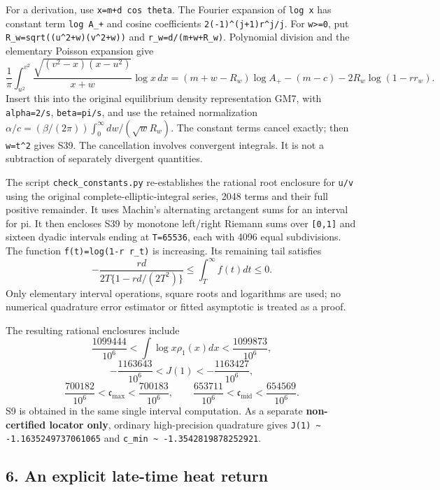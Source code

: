 \documentclass[11pt]{article}
\begin{document}
For a derivation, use \texttt{x=m+d\ cos\ theta}. The Fourier expansion of \texttt{log\ x} has constant term \texttt{log\ A\_+} and cosine coefficients \nolinkurl{2(-1)^(j+1)r^j/j}. For \texttt{w\textgreater{}=0}, put \nolinkurl{R_w=sqrt((u^2+w)(v^2+w))} and \texttt{r\_w=d/(m+w+R\_w)}. Polynomial division and the elementary Poisson expansion give \[
 \frac1\pi\int_{u^2}^{v^2}
 \frac{\sqrt{(v^2-x)(x-u^2)}}{x+w}\log x\,dx
 =(m+w-R_w)\log A_+-(m-c)-2R_w\log(1-r r_w).                    \tag{S40}
\] Insert this into the original equilibrium density representation GM7, with \texttt{alpha=2/s}, \texttt{beta=pi/s}, and use the retained normalization \(\alpha/c=(\beta/(2\pi))\int_0^\infty dw/(\sqrt w R_w)\). The constant terms cancel exactly; then \texttt{w=t\^{}2} gives S39. The cancellation involves convergent integrals. It is not a subtraction of separately divergent quantities.

The script \nolinkurl{check_constants.py} re-establishes the rational root enclosure for \texttt{u/v} using the original complete-elliptic-integral series, 2048 terms and their full positive remainder. It uses Machin's alternating arctangent sums for an interval for pi. It then encloses S39 by monotone left/right Riemann sums over \texttt{{[}0,1{]}} and sixteen dyadic intervals ending at \texttt{T=65536}, each with 4096 equal subdivisions. The function \nolinkurl{f(t)=log(1-r r_t)} is increasing. Its remaining tail satisfies \[
 -\frac{rd}{2T\{1-rd/(2T^2)\}}\le\int_T^\infty f(t)dt\le0.        \tag{S41}
\] Only elementary interval operations, square roots and logarithms are used; no numerical quadrature error estimator or fitted asymptotic is treated as a proof.

The resulting rational enclosures include \[
 \frac{1099444}{10^6}<\int\log x\rho_1(x)dx<\frac{1099873}{10^6},
\] \[
 -\frac{1163643}{10^6}<J(1)<-\frac{1163427}{10^6},
\] \[
 \frac{700182}{10^6}<\mathfrak c_{\max}<\frac{700183}{10^6},\qquad
 \frac{653711}{10^6}<\mathfrak c_{\mathrm{mid}}<\frac{654569}{10^6}.
\] S9 is obtained in the same single interval computation. As a separate \textbf{non-certified locator only}, ordinary high-precision quadrature gives \nolinkurl{J(1) ~ -1.1635249737061065} and \nolinkurl{c_min ~ -1.3542819878252921}.

\subsection{6. An explicit late-time heat return}\label{an-explicit-late-time-heat-return}
\end{document}
